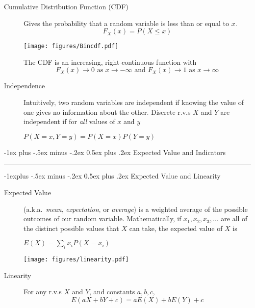 \documentclass[10pt,landscape]{article}
\makeatletter
\renewcommand{\section}{\@startsection{section}{1}{0mm}%
                                {-1ex plus -.5ex minus -.2ex}%
                                {0.5ex plus .2ex}%
                                {\normalfont\large\bfseries}}
\renewcommand{\subsection}{\@startsection{subsection}{2}{0mm}%
                                {-1explus -.5ex minus -.2ex}%
                                {0.5ex plus .2ex}%
                                {\normalfont\normalsize\bfseries}}
\makeatother
\begin{document}
\begin{multicols*}{3}
\begin{description}
\item[Cumulative Distribution Function (CDF)] 
Gives the probability that a random variable is less than or equal to $x$.
\[F_X(x) = P(X \leq x)\]
\begin{minipage}{\linewidth}
            \centering
\texttt{[image: figures/Bincdf.pdf]}
        \end{minipage}

The CDF is an increasing, right-continuous function with
\[F_X(x) \to 0 \textrm{ as $x \to -\infty$ and } F_X(x) \to 1 \textrm{ as $x \to \infty$} \]
\item[Independence] Intuitively, two random variables are independent if knowing the value of one gives  no information about the other. Discrete r.v.s $X$ and $Y$ are independent if for \emph{all} values of $x$ and $y$  \begin{center}
$P(X=x, Y=y) = P(X = x)P(Y = y)$
\end{center}

\end{description}

\section{Expected Value and Indicators}\smallskip \hrule height 2pt \smallskip


\subsection{Expected Value and Linearity}
\begin{description}
\item[Expected Value] (a.k.a.~\emph{mean}, \emph{expectation}, or \emph{average}) is a weighted average of the possible outcomes of our random variable. Mathematically, if $x_1, x_2, x_3, \dots$ are all of the distinct possible values that $X$ can take, the expected value of $X$ is
\begin{center}
$E(X) = \sum\limits_{i}x_iP(X=x_i)$
\end{center}

\begin{minipage}{\linewidth}
            \centering
\texttt{[image: figures/linearity.pdf]}
        \end{minipage}


\item[Linearity] For any r.v.s $X$ and $Y$, and constants $a,b,c,$ 
\[E(aX + bY + c) = aE(X) + bE(Y) + c \]


\end{description}
\end{multicols*}
\end{document}
